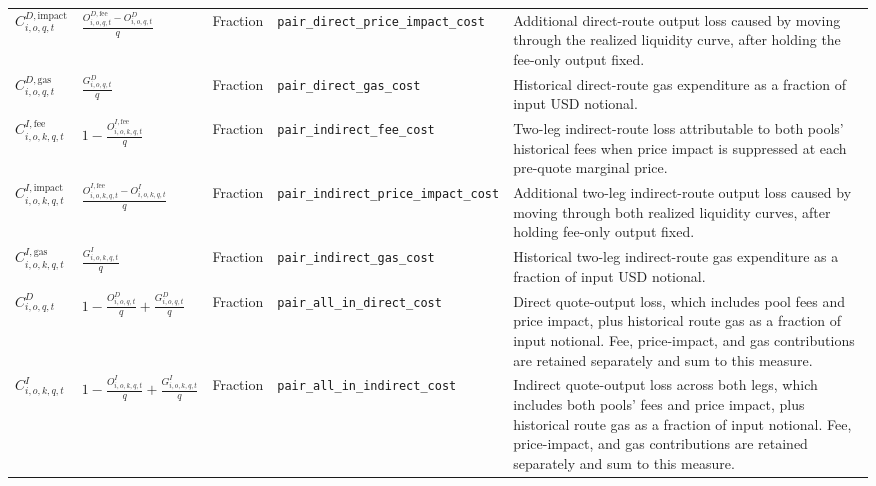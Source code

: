 \begin{tabularx}{\linewidth}{@{}>{\raggedright\arraybackslash}X>{\raggedright\arraybackslash}Xl>{\raggedright\arraybackslash}X>{\raggedright\arraybackslash}X@{}}
$C^{D,\mathrm{impact}}_{i,o,q,t}$ & $\displaystyle\frac{O^{D,\mathrm{fee}}_{i,o,q,t}-O^{D}_{i,o,q,t}}{q}$ & Fraction & \texttt{pair\_\allowbreak{}direct\_\allowbreak{}price\_\allowbreak{}impact\_\allowbreak{}cost} & Additional direct-route output loss caused by moving through the realized liquidity curve, after holding the fee-only output fixed. \\
$C^{D,\mathrm{gas}}_{i,o,q,t}$ & $\displaystyle\frac{G^{D}_{i,o,q,t}}{q}$ & Fraction & \texttt{pair\_\allowbreak{}direct\_\allowbreak{}gas\_\allowbreak{}cost} & Historical direct-route gas expenditure as a fraction of input USD notional. \\
$C^{I,\mathrm{fee}}_{i,o,k,q,t}$ & $\displaystyle 1-\frac{O^{I,\mathrm{fee}}_{i,o,k,q,t}}{q}$ & Fraction & \texttt{pair\_\allowbreak{}indirect\_\allowbreak{}fee\_\allowbreak{}cost} & Two-leg indirect-route loss attributable to both pools' historical fees when price impact is suppressed at each pre-quote marginal price. \\
$C^{I,\mathrm{impact}}_{i,o,k,q,t}$ & $\displaystyle\frac{O^{I,\mathrm{fee}}_{i,o,k,q,t}-O^{I}_{i,o,k,q,t}}{q}$ & Fraction & \texttt{pair\_\allowbreak{}indirect\_\allowbreak{}price\_\allowbreak{}impact\_\allowbreak{}cost} & Additional two-leg indirect-route output loss caused by moving through both realized liquidity curves, after holding fee-only output fixed. \\
$C^{I,\mathrm{gas}}_{i,o,k,q,t}$ & $\displaystyle\frac{G^{I}_{i,o,k,q,t}}{q}$ & Fraction & \texttt{pair\_\allowbreak{}indirect\_\allowbreak{}gas\_\allowbreak{}cost} & Historical two-leg indirect-route gas expenditure as a fraction of input USD notional. \\
$C^{D}_{i,o,q,t}$ & $\displaystyle 1-\frac{O^{D}_{i,o,q,t}}{q}+\frac{G^{D}_{i,o,q,t}}{q}$ & Fraction & \texttt{pair\_\allowbreak{}all\_\allowbreak{}in\_\allowbreak{}direct\_\allowbreak{}cost} & Direct quote-output loss, which includes pool fees and price impact, plus historical route gas as a fraction of input notional. Fee, price-impact, and gas contributions are retained separately and sum to this measure. \\
$C^{I}_{i,o,k,q,t}$ & $\displaystyle 1-\frac{O^{I}_{i,o,k,q,t}}{q}+\frac{G^{I}_{i,o,k,q,t}}{q}$ & Fraction & \texttt{pair\_\allowbreak{}all\_\allowbreak{}in\_\allowbreak{}indirect\_\allowbreak{}cost} & Indirect quote-output loss across both legs, which includes both pools' fees and price impact, plus historical route gas as a fraction of input notional. Fee, price-impact, and gas contributions are retained separately and sum to this measure. \\

\end{tabularx}
